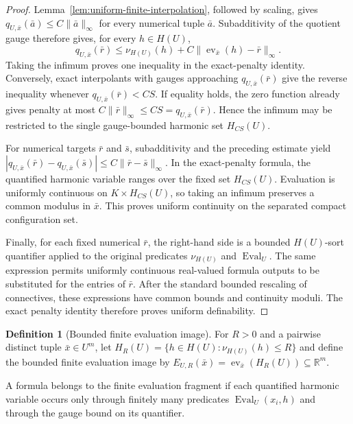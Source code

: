 \documentclass{amsart}
\theoremstyle{definition}
\newtheorem{definition}{Definition}[section]
\theoremstyle{remark}
\numberwithin{equation}{section}
\begin{document}
\begin{proof}
	Lemma~\ref{lem:uniform-finite-interpolation}, followed by scaling, gives $q_{U,\bar x}(\bar a)\le C\|\bar a\|_\infty$ for every numerical tuple $\bar a$. Subadditivity of the quotient gauge therefore gives, for every $h\in H(U)$,
	$$q_{U,\bar x}(\bar r)\le\nu_{H(U)}(h)+C\|\operatorname{ev}_{\bar x}(h)-\bar r\|_\infty.$$
	Taking the infimum proves one inequality in the exact-penalty identity. Conversely, exact interpolants with gauges approaching $q_{U,\bar x}(\bar r)$ give the reverse inequality whenever $q_{U,\bar x}(\bar r)<CS$. If equality holds, the zero function already gives penalty at most $C\|\bar r\|_\infty\le CS=q_{U,\bar x}(\bar r)$. Hence the infimum may be restricted to the single gauge-bounded harmonic set $H_{CS}(U)$.
	
	For numerical targets $\bar r$ and $\bar s$, subadditivity and the preceding estimate yield $|q_{U,\bar x}(\bar r)-q_{U,\bar x}(\bar s)|\le C\|\bar r-\bar s\|_\infty$. In the exact-penalty formula, the quantified harmonic variable ranges over the fixed set $H_{CS}(U)$. Evaluation is uniformly continuous on $K\times H_{CS}(U)$, so taking an infimum preserves a common modulus in $\bar x$. This proves uniform continuity on the separated compact configuration set.
	
	Finally, for each fixed numerical $\bar r$, the right-hand side is a bounded $H(U)$-sort quantifier applied to the original predicates $\nu_{H(U)}$ and $\operatorname{Eval}_U$. The same expression permits uniformly continuous real-valued formula outputs to be substituted for the entries of $\bar r$. After the standard bounded rescaling of connectives, these expressions have common bounds and continuity moduli. The exact penalty identity therefore proves uniform definability.
\end{proof}

\begin{definition}[Bounded finite evaluation image]
	\label{def:bounded-finite-evaluation-image}
	For $R>0$ and a pairwise distinct tuple $\bar x\in U^m$, let $H_R(U)=\{h\in H(U):\nu_{H(U)}(h)\le R\}$ and define the bounded finite evaluation image by
	$E_{U,R}(\bar x)=\operatorname{ev}_{\bar x}(H_R(U))\subseteq\mathbb R^m.$
\end{definition}

A formula belongs to the finite evaluation fragment if each quantified harmonic variable occurs only through finitely many predicates $\operatorname{Eval}_U(x_i,h)$ and through the gauge bound on its quantifier. %
\end{document}
